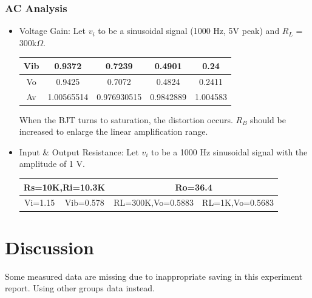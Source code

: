         \subsubsection{AC Analysis}
        \begin{itemize}
            \item Voltage Gain: Let $v_i$ to be a sinusoidal signal (1000 Hz, 5V peak) and $R_L$ = 300k$\Omega$.
                \begin{table}[h]
                \centering
                \begin{tabular}{|c|c|c|c|c|}
                    \hline
                    Vib & 0.9372     & 0.7239      & 0.4901    & 0.24     \\ \hline
                    Vo  & 0.9425     & 0.7072      & 0.4824    & 0.2411   \\ \hline
                    Av  & 1.00565514 & 0.976930515 & 0.9842889 & 1.004583 \\ \hline
                \end{tabular}
                \end{table}
                \FloatBarrier
                When the BJT turns to saturation, the distortion occurs. $R_B$ should be increased to enlarge the linear amplification range.
            \item Input \& Output Resistance: Let $v_i$ to be  a 1000 Hz sinusoidal signal with the amplitude of 1 V.
                \begin{table}[h]
                \centering
                \begin{tabular}{|cc|cc|}
                    \hline
                    \multicolumn{2}{|c|}{Rs=10K,Ri=10.3K}     & \multicolumn{2}{c|}{Ro=36.4}                             \\ \hline
                    \multicolumn{1}{|c|}{Vi=1.15} & Vib=0.578 & \multicolumn{1}{c|}{RL=300K,Vo=0.5883} & RL=1K,Vo=0.5683 \\ \hline
                \end{tabular}
                \end{table}
                \FloatBarrier
        \end{itemize}
        
    
\section{Discussion}
    Some measured data are missing due to inappropriate saving in this experiment report. Using other groups data instead.

